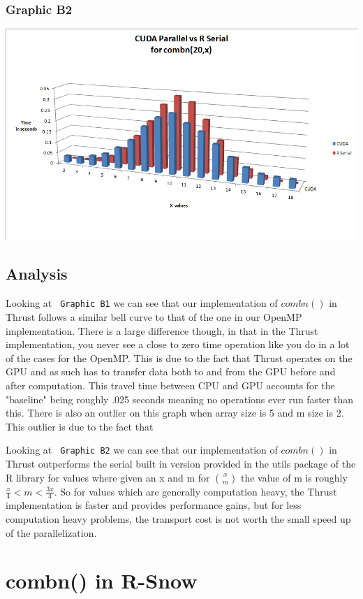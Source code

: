 \documentclass[titlepage, 11pt]{article}
\begin{document}
\subsubsection{Graphic B2}
\includegraphics[scale = 0.5]{images/ThrustvsR.png}

\subsection{Analysis}
Looking at \verb; Graphic B1; we can see that our implementation of $combn()$ in Thrust follows a similar bell curve to that of the one in our OpenMP implementation. There is a large difference though, in that in the Thrust implementation, you never see a close to zero time operation like you do in a lot of the cases for the OpenMP. This is due to the fact that Thrust operates on the GPU and as such has to transfer data both to and from the GPU before and after computation. This travel time between CPU and GPU accounts for the "baseline" being roughly .025 seconds meaning no operations ever run faster than this. There is also an outlier on this graph when array size is 5 and m size is 2. This outlier is due to the fact that 

Looking at \verb; Graphic B2; we can see that our implementation of $combn()$ in Thrust outperforms the serial built in version provided in the utils package of the R library for values where given an x and m for ${x \choose m}$ the value of m is roughly $\frac{x}{4} < m < \frac{3x}{4}$. So for values which are generally computation heavy, the Thrust implementation is faster and provides performance gains, but for less computation heavy problems, the transport cost is not worth the small speed up of the parallelization.

\section{combn() in R-Snow}
\end{document}
